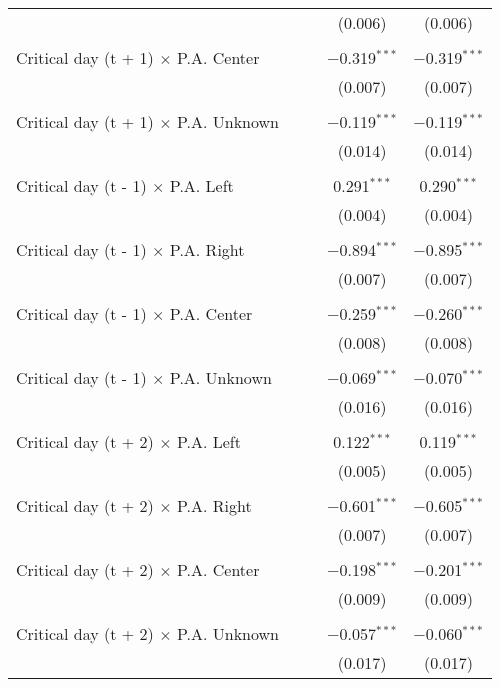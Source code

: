 \documentclass[
]{article}
\begin{document}
\begin{table}[!htbp]
{\begin{tabular}{@{\extracolsep{5pt}}lcccc}
  &  &  & (0.006) & (0.006) \\ 
  & & & & \\ 
 Critical day (t + 1) $\times$ P.A. Center &  &  & $-$0.319$^{***}$ & $-$0.319$^{***}$ \\ 
  &  &  & (0.007) & (0.007) \\ 
  & & & & \\ 
 Critical day (t + 1) $\times$ P.A. Unknown &  &  & $-$0.119$^{***}$ & $-$0.119$^{***}$ \\ 
  &  &  & (0.014) & (0.014) \\ 
  & & & & \\ 
 Critical day (t - 1) $\times$ P.A. Left &  &  & 0.291$^{***}$ & 0.290$^{***}$ \\ 
  &  &  & (0.004) & (0.004) \\ 
  & & & & \\ 
 Critical day (t - 1) $\times$ P.A. Right &  &  & $-$0.894$^{***}$ & $-$0.895$^{***}$ \\ 
  &  &  & (0.007) & (0.007) \\ 
  & & & & \\ 
 Critical day (t - 1) $\times$ P.A. Center &  &  & $-$0.259$^{***}$ & $-$0.260$^{***}$ \\ 
  &  &  & (0.008) & (0.008) \\ 
  & & & & \\ 
 Critical day (t - 1) $\times$ P.A. Unknown &  &  & $-$0.069$^{***}$ & $-$0.070$^{***}$ \\ 
  &  &  & (0.016) & (0.016) \\ 
  & & & & \\ 
 Critical day (t + 2) $\times$ P.A. Left &  &  & 0.122$^{***}$ & 0.119$^{***}$ \\ 
  &  &  & (0.005) & (0.005) \\ 
  & & & & \\ 
 Critical day (t + 2) $\times$ P.A. Right &  &  & $-$0.601$^{***}$ & $-$0.605$^{***}$ \\ 
  &  &  & (0.007) & (0.007) \\ 
  & & & & \\ 
 Critical day (t + 2) $\times$ P.A. Center &  &  & $-$0.198$^{***}$ & $-$0.201$^{***}$ \\ 
  &  &  & (0.009) & (0.009) \\ 
  & & & & \\ 
 Critical day (t + 2) $\times$ P.A. Unknown &  &  & $-$0.057$^{***}$ & $-$0.060$^{***}$ \\ 
  &  &  & (0.017) & (0.017) \\ 

\end{tabular}}
\end{table}
\end{document}
